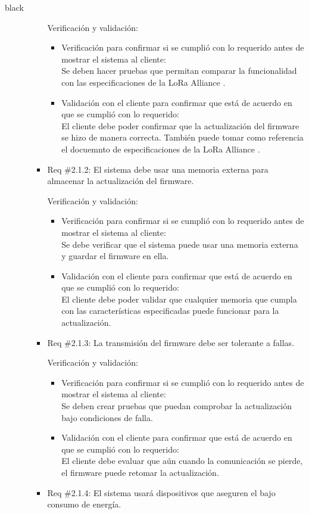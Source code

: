 \documentclass[11pt]{charter}
\begin{document}
\begin{consigna}{black}
\begin{itemize}
\begin{itemize}
\begin{itemize}
			 Verificación y validación:
			 \begin{itemize}
			 	\item Verificación para confirmar si se cumplió con lo requerido antes de mostrar el sistema al cliente:\\
			 	Se deben hacer pruebas que permitan comparar la funcionalidad con las especificaciones de la LoRa Alliance \textregistered.
			 	\item Validación con el cliente para confirmar que está de acuerdo en que se cumplió con lo requerido:\\
			 	El cliente debe poder confirmar que la actualización del firmware se hizo de manera correcta. También puede tomar como referencia el docuemnto de especificaciones de la LoRa Alliance \textregistered.
			 \end{itemize}
		     \item Req \#2.1.2: El sistema debe usar una memoria externa para almacenar la actualización del firmware.
		     
		     Verificación y validación:
		     \begin{itemize}
		     	\item Verificación para confirmar si se cumplió con lo requerido antes de mostrar el sistema al cliente:\\
		     	Se debe verificar que el sistema puede usar una memoria externa y guardar el firmware en ella.
		     	\item Validación con el cliente para confirmar que está de acuerdo en que se cumplió con lo requerido:\\
		     	El cliente debe poder validar que cualquier memoria que cumpla con las características especificadas puede funcionar para la actualización. 
		     \end{itemize}
	         \item Req \#2.1.3: La transmisión del firmware debe ser tolerante a fallas.
	         
	         Verificación y validación:
	         \begin{itemize}
	         	\item Verificación para confirmar si se cumplió con lo requerido antes de mostrar el sistema al cliente:\\
	         	Se deben crear pruebas que puedan comprobar la actualización bajo condiciones de falla.
	         	\item Validación con el cliente para confirmar que está de acuerdo en que se cumplió con lo requerido:\\
	         	El cliente debe evaluar que aún cuando la comunicación se pierde, el firmware puede retomar la actualización.
	         \end{itemize}
             \item Req \#2.1.4: El sistema usará dispositivos que aseguren el bajo consumo de energía.
             

\end{itemize}
\end{itemize}
\end{itemize}
\end{consigna}
\end{document}
